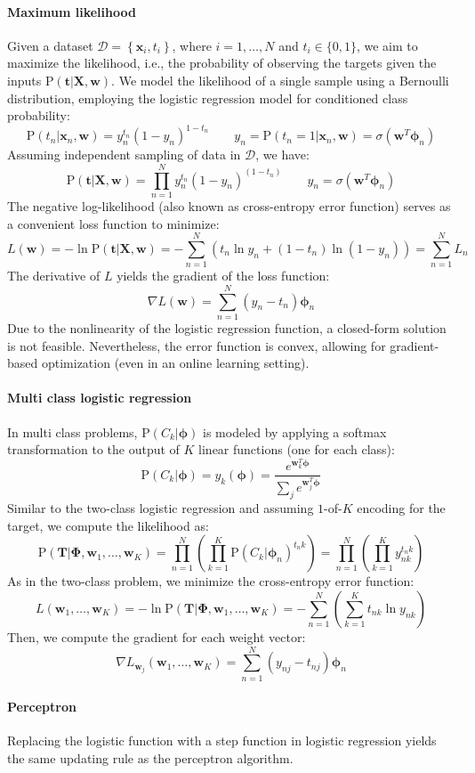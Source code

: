 \paragraph*{Maximum likelihood}
Given a dataset $\mathcal{D}=\left\{ \textbf{x}_i,t_i \right\}$, where $i=1,\dots,N$ and $t_i \in \{0,1\}$, we aim to maximize the likelihood, i.e., the probability of observing the targets given the inputs $\text{P}(\textbf{t}|\textbf{X},\textbf{w})$. 
We model the likelihood of a single sample using a Bernoulli distribution, employing the logistic regression model for conditioned class probability:
\[\text{P}(t_n|\textbf{x}_n,\textbf{w})=y_n^{t_n}{\left( 1-y_n \right)}^{1-t_n} \qquad y_n=\text{P}(t_n=1|\textbf{x}_n,\textbf{w})=\sigma(\textbf{w}^T\boldsymbol{\phi}_n)\]
Assuming independent sampling of data in $\mathcal{D}$, we have:
\[\text{P}(\textbf{t}|\textbf{X},\textbf{w})=\prod_{n=1}^N y_n^{t_n}{\left( 1-y_n \right)}^{(1-t_n)} \qquad y_n=\sigma(\textbf{w}^T\boldsymbol{\phi}_n)\]
The negative log-likelihood (also known as cross-entropy error function) serves as a convenient loss function to minimize:
\[L(\textbf{w})=-\ln \text{P}(\textbf{t}|\textbf{X},\textbf{w})=-\sum_{n=1}^N \left( t_n\ln y_n +(1-t_n) \ln (1-y_n) \right) = \sum_{n=1}^N L_n\]
The derivative of $L$ yields the gradient of the loss function:
\[\nabla L(\textbf{w})=\sum_{n=1}^N\left( y_n-t_n \right) \boldsymbol{\phi}_n\]
Due to the nonlinearity of the logistic regression function, a closed-form solution is not feasible. 
Nevertheless, the error function is convex, allowing for gradient-based optimization (even in an online learning setting).

\paragraph*{Multi class logistic regression}
In multi class problems, $\text{P}(C_k|\boldsymbol{\phi})$ is modeled by applying a softmax transformation to the output of $K$ linear functions (one for each class):
\[\text{P}(C_k|\boldsymbol{\phi})=y_k(\boldsymbol{\phi})=\dfrac{e^{\textbf{w}_k^T\boldsymbol{\phi}}}{\sum_j e^{\textbf{w}_j^T\boldsymbol{\phi}}}\]
Similar to the two-class logistic regression and assuming $1$-of-$K$  encoding for the target, we compute the likelihood as:
\[\text{P}(\textbf{T}|\boldsymbol{\Phi},\textbf{w}_1,\dots,\textbf{w}_K)=\prod_{n=1}^N \left( \prod_{k=1}^K \text{P}{(C_k|\boldsymbol{\phi}_n)}^{t_n k} \right)=\prod_{n=1}^N \left( \prod_{k=1}^K y^{t_n k}_{nk} \right)\]
As in the two-class problem, we minimize the cross-entropy error function:
\[L(\textbf{w}_1,\dots,\textbf{w}_K)=-\ln \text{P}(\textbf{T}|\boldsymbol{\Phi},\textbf{w}_1,\dots,\textbf{w}_K)=-\sum_{n=1}^N \left(\sum_{k=1}^K t_{nk}\ln y_{nk} \right)\]
Then, we compute the gradient for each weight vector:
\[\nabla L_{\textbf{w}_j}(\textbf{w}_1,\dots,\textbf{w}_K)=\sum_{n=1}^N\left( y_{nj}-t_{nj} \right) \boldsymbol{\phi}_n\]

\paragraph*{Perceptron}
Replacing the logistic function with a step function in logistic regression yields the same updating rule as the perceptron algorithm.